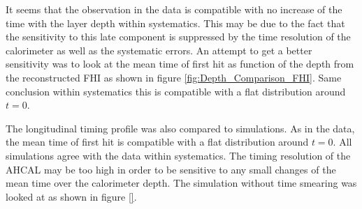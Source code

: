 It seems that the observation in the data is compatible with no increase of the time with the layer depth within systematics. This may be due to the fact that the sensitivity to this late component is suppressed by the time resolution of the calorimeter as well as the systematic errors. An attempt to get a better sensitivity was to look at the mean time of first hit as function of the depth from the reconstructed FHI as shown in figure \ref{fig:Depth_Comparison_FHI}. Same conclusion within systematics this is compatible with a flat distribution around $t=0$.

The longitudinal timing profile was also compared to simulations. As in the data, the mean time of first hit is compatible with a flat distribution around $t=0$. All simulations agree with the data within systematics. The timing resolution of the AHCAL may be too high in order to be sensitive to any small changes of the mean time over the calorimeter depth. The simulation without time smearing was looked at as shown in figure \ref{}.

